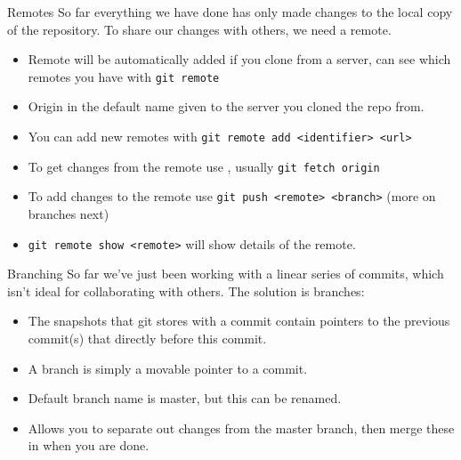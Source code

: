 \documentclass{beamer}
\begin{document}
\begin{frame}{Remotes}
    So far everything we have done has only made changes to the local copy of the repository. To share our changes with others, we need a remote.
    \begin{itemize}
        \item Remote will be automatically added if you clone from a server, can see which remotes you have with \texttt{git remote}
        \item Origin in the default name given to the server you cloned the repo from.
        \item You can add new remotes with \texttt{git remote add <identifier> <url>}
        \item To get changes from the remote use , usually \texttt{git fetch origin}
        \item To add changes to the remote use \texttt{git push <remote> <branch>} (more on branches next)
        \item \texttt{git remote show <remote>} will show details of the remote.
    \end{itemize}
\end{frame}

\begin{frame}{Branching}
    So far we've just been working with a linear series of commits, which isn't ideal for collaborating with others. The solution is branches:
    \begin{itemize}
        \item The snapshots that git stores with a commit contain pointers to the previous commit(s) that directly before this commit.
        \item A branch is simply a movable pointer to a commit.
        \item Default branch name is master, but this can be renamed.
        \item Allows you to separate out changes from the master branch, then merge these in when you are done.
    \end{itemize}
\end{frame}
\end{document}
